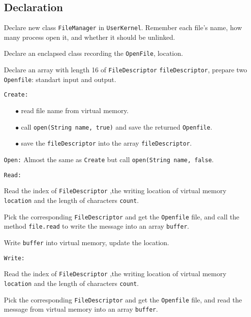 \documentclass{article}
\begin{document}
\subsection{Declaration}
\begin{compactitem}
\item Declare new class \texttt{FileManager} in \texttt{UserKernel}. Remember each file's name, how many process open it, and whether it should
	be unlinked.
\item Declare an enclapsed  class recording the \texttt{OpenFile}, location.
\item Declare an array with length 16 of \texttt{FileDescriptor} \texttt{fileDescriptor}, prepare two \texttt{Openfile}: standart input and output.
\item \texttt{Create:}
	\begin{enumerate}
		\item[$\bullet$] read file name from virtual memory.
		\item[$\bullet$] call \texttt{open(String name, true)} and save the returned \texttt{Openfile}.
		\item[$\bullet$] save the \texttt{fileDescriptor} into the array \texttt{fileDescriptor}.
	\end{enumerate}
\item \texttt{Open:} Almost the same as \texttt{Create} but call \texttt{open(String name, false}.
\item \texttt{Read:}
	\begin{compactitem}
		\item Read the index of \texttt{FileDescriptor} ,the writing location of virtual memory \texttt{location} and the length of characters \texttt{count}.
		\item Pick the corresponding \texttt{FileDescriptor} and get the \texttt{Openfile} file, and call the method \texttt{file.read} to write the message into an array \texttt{buffer}.
		\item Write \texttt{buffer} into virtual memory, update the location.
	\end{compactitem}
\item \texttt{Write:}
	\begin{compactitem}
		\item Read the index of \texttt{FileDescriptor} ,the writing location of virtual memory \texttt{location} and the length of characters \texttt{count}.
		\item Pick the corresponding \texttt{FileDescriptor} and get the \texttt{Openfile} file, and read the message from virtual memory into an array \texttt{buffer}.

\end{compactitem}
\end{compactitem}
\end{document}
